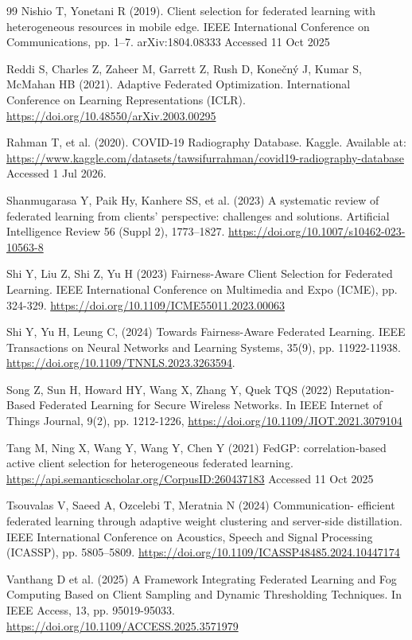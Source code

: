 \documentclass[pdflatex,sn-mathphys-num,oneside]{sn-jnl}%
\theoremstyle{thmstyleone}%
\theoremstyle{thmstyletwo}%
\theoremstyle{thmstylethree}%
\begin{document}
\begin{thebibliography}{99}
Nishio T, Yonetani R (2019). Client selection for federated learning with heterogeneous resources in mobile edge. IEEE International Conference on Communications, pp. 1–7. arXiv:1804.08333 Accessed 11 Oct 2025

Reddi S, Charles Z, Zaheer M, Garrett Z, Rush D, Konečný J, Kumar S, McMahan HB (2021). Adaptive Federated Optimization. International Conference on Learning Representations (ICLR). \url{https://doi.org/10.48550/arXiv.2003.00295}

Rahman T, et al. (2020). COVID-19 Radiography Database. Kaggle. Available at: \url{https://www.kaggle.com/datasets/tawsifurrahman/covid19-radiography-database} Accessed 1 Jul 2026.

Shanmugarasa Y, Paik Hy, Kanhere SS, et al. (2023) A systematic review of federated learning from clients’ perspective: challenges and solutions. Artificial Intelligence Review 56 (Suppl 2), 1773–1827. \url{https://doi.org/10.1007/s10462-023-10563-8}

Shi Y, Liu Z, Shi Z, Yu H (2023) Fairness-Aware Client Selection for Federated Learning. IEEE International Conference on Multimedia and Expo (ICME), pp. 324-329. \url{https://doi.org/10.1109/ICME55011.2023.00063}

Shi Y, Yu H, Leung C, (2024) Towards Fairness-Aware Federated Learning. IEEE Transactions on Neural Networks and Learning Systems, 35(9), pp. 11922-11938. \url{https://doi.org/10.1109/TNNLS.2023.3263594}.

Song Z, Sun H, Howard HY, Wang X, Zhang Y, Quek TQS (2022) Reputation-Based Federated Learning for Secure Wireless Networks. In IEEE Internet of Things Journal, 9(2), pp. 1212-1226, \url{https://doi.org/10.1109/JIOT.2021.3079104}

Tang M, Ning X, Wang Y, Wang Y, Chen Y (2021) FedGP: correlation-based active client selection for heterogeneous federated learning. \url{https://api.semanticscholar.org/CorpusID:260437183} Accessed 11 Oct 2025

Tsouvalas V, Saeed A, Ozcelebi T, Meratnia N (2024) Communication- efficient federated learning through adaptive weight clustering and server-side distillation. IEEE International Conference on Acoustics, Speech and Signal Processing (ICASSP), pp. 5805–5809. \url{https://doi.org/10.1109/ICASSP48485.2024.10447174}

Vanthang D et al. (2025) A Framework Integrating Federated Learning and Fog Computing Based on Client Sampling and Dynamic Thresholding Techniques. In IEEE Access, 13, pp. 95019-95033. \url{https://doi.org/10.1109/ACCESS.2025.3571979}


\end{thebibliography}
\end{document}

